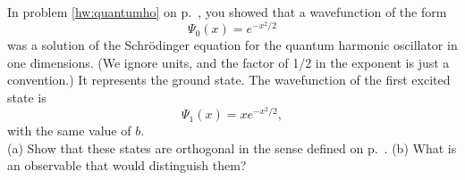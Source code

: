 In problem \ref{hw:quantumho} on p.~\pageref{hw:quantumho}, you showed that a wavefunction of the form
\begin{equation*}
\Psi_0(x)=e^{-x^2/2}
\end{equation*}
was a solution of the Schr\"{o}dinger equation for the quantum harmonic oscillator in
one dimensions. (We ignore units, and the factor of 1/2 in the exponent is just a convention.)
It represents the ground state. The wavefunction of the first
excited state is
\begin{equation*}
\Psi_1(x)=xe^{-x^2/2},
\end{equation*}
with the same value of $b$.\\
(a) Show that these states are orthogonal in the sense defined 
on p.~\pageref{orthogonal-wavefunctions}.\hwendpart
(b) What is an observable that would distinguish them?
